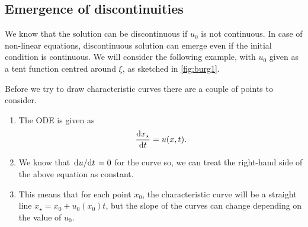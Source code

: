 \documentclass[justified, nobib, a4page]{tufte-handout}
\begin{document}
\subsection{Emergence of discontinuities}
We know that the solution can be discontinuous if \(u_0\) is not continuous. In
case of non-linear equations, discontinuous solution can emerge even if the
initial condition is continuous. We will consider the following example, with
\(u_0\) given as a tent function centred around \(\xi\), as sketched in
\cref{fig:burg1}.

\begin{marginfigure}
  \begin{center}
  \end{center}
  \caption{Initial field for the Burgers equation example.}\label{fig:burg1}
\end{marginfigure}

Before we try to draw characteristic curves there are a couple of points to
consider.
\begin{enumerate}
  \item The ODE is given as 
    \[
      \odv{x_\star}{t} = u(x, t).
    \]
  \item We know that \(\odv{u}/{t} = 0\) for the curve so, we can treat the
    right-hand side of the above equation as constant.
  \item This means that for each point \(x_0\), the characteristic curve will
    be a straight line \(x_\star = x_0 + u_0(x_0)t\), but the slope of the curves
    can change depending on the value of \(u_0\).
\end{enumerate}
\end{document}
